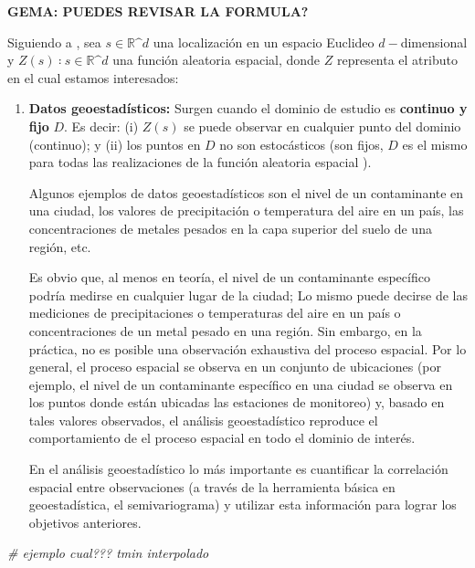 \documentclass[
]{report}
\newenvironment{Shaded}{\begin{snugshade}}{\end{snugshade}}
\newcommand{\CommentTok}[1]{\textcolor[rgb]{0.56,0.35,0.01}{\textit{#1}}}
\begin{document}
\textbf{GEMA: PUEDES REVISAR LA FORMULA?}

Siguiendo a \citet{cressie1993}, sea \(s ∈ ℝ\^d\) una localización en un espacio Euclideo
\(d-\)dimensional y \({Z(s)∶ s ∈ ℝ\^d}\) una función aleatoria espacial, donde \(Z\)
representa el atributo en el cual estamos interesados:

\begin{enumerate}
\def\labelenumi{\arabic{enumi}.}
\item
  \textbf{Datos geoestadísticos:} Surgen cuando el dominio de estudio es \textbf{continuo
  y fijo} \(D\). Es decir: (i) \(Z(s)\) se puede observar en cualquier punto del
  dominio (continuo); y (ii) los puntos en \(D\) no son estocásticos (son fijos,
  \(D\) es el mismo para todas las realizaciones de la función aleatoria
  espacial ).

  Algunos ejemplos de datos geoestadísticos son el nivel de un contaminante en
  una ciudad, los valores de precipitación o temperatura del aire en un país,
  las concentraciones de metales pesados en la capa superior del suelo de una
  región, etc.

  Es obvio que, al menos en teoría, el nivel de un contaminante específico
  podría medirse en cualquier lugar de la ciudad; Lo mismo puede decirse de
  las mediciones de precipitaciones o temperaturas del aire en un país o
  concentraciones de un metal pesado en una región. Sin embargo, en la
  práctica, no es posible una observación exhaustiva del proceso espacial. Por
  lo general, el proceso espacial se observa en un conjunto de ubicaciones
  (por ejemplo, el nivel de un contaminante específico en una ciudad se
  observa en los puntos donde están ubicadas las estaciones de monitoreo) y,
  basado en tales valores observados, el análisis geoestadístico reproduce el
  comportamiento de el proceso espacial en todo el dominio de interés.

  En el análisis geoestadístico lo más importante es cuantificar la
  correlación espacial entre observaciones (a través de la herramienta básica
  en geoestadística, el semivariograma) y utilizar esta información para
  lograr los objetivos anteriores.
\end{enumerate}

\begin{Shaded}
\begin{Highlighting}[]
\CommentTok{\# ejemplo cual??? tmin interpolado}
\end{Highlighting}
\end{Shaded}
\end{document}
